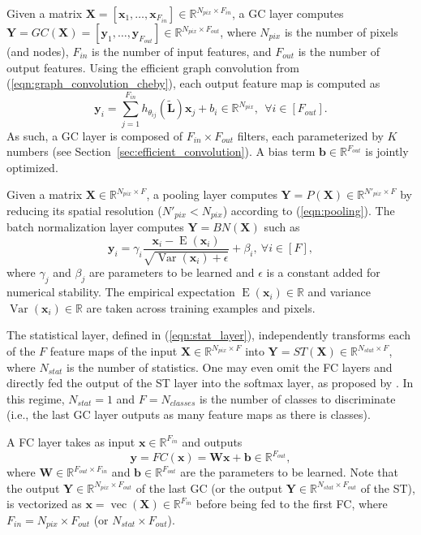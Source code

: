 \documentclass[final,twocolumn,3p,times,authoryear]{elsarticle}
\newcommand{\secref}[1]{Section~\ref{sec:#1}}
\newcommand{\eqnref}[1]{(\ref{eqn:#1})}
\renewcommand{\b}[1]{{\bm{#1}}}   %
\newcommand{\1}{\b{1}}              %
\newcommand{\0}{\b{0}}              %
\renewcommand{\L}{\b{L}}
\newcommand{\tL}{\tilde{\L}}
\newcommand{\W}{\b{W}}
\newcommand{\x}{\b{x}}
\newcommand{\X}{\b{X}}
\newcommand{\y}{\b{y}}
\newcommand{\Y}{\b{Y}}
\newcommand{\R}{\mathbb{R}}
\DeclareMathOperator*{\esp}{E}
\DeclareMathOperator*{\var}{Var}
\DeclareMathOperator*{\vect}{vec}
\begin{document}
Given a matrix $\X = [\x_1, \ldots, \x_{F_{in}}] \in \R^{N_{pix} \times F_{in}}$, a GC layer computes $\Y = GC(\X) = [\y_1, \ldots, \y_{F_{out}}] \in \R^{N_{pix} \times F_{out}}$, where $N_{pix}$ is the number of pixels (and nodes), $F_{in}$ is the number of input features, and $F_{out}$ is the number of output features.
Using the efficient graph convolution from \eqnref{graph_convolution_cheby}, each output feature map is computed as
\begin{equation*}
	\y_i = \sum_{j=1}^{F_{in}} h_{\theta_{ij}}(\tL) \x_j + b_i \in \R^{N_{pix}}, \ \ \forall i \in [F_{out}].
\end{equation*}
As such, a GC layer is composed of $F_{in} \times F_{out}$ filters, each parameterized by $K$ numbers (see \secref{efficient_convolution}). A bias term $\b b \in \R^{F_{out}}$ is jointly optimized.

Given a matrix $\X \in \R^{N_{pix} \times F}$, a pooling layer computes $\Y = P(\X) \in \R^{N'_{pix} \times F}$ by reducing its spatial resolution ($N'_{pix} < N_{pix}$) according to \eqnref{pooling}.
The batch normalization layer \citep{ioffe2015batchnorm} computes $\Y = BN(\X)$ such as
\begin{equation*}
	\y_i = \gamma_i \frac{\x_i - \esp(\x_i)}{\sqrt{\var(\x_i) + \epsilon}} + \beta_i, \ \forall i \in [F],
\end{equation*}
where $\gamma_{j}$ and $\beta_{j}$ are parameters to be learned and $\epsilon$ is a constant added for numerical stability. The empirical expectation $\esp(\x_i) \in \R$ and variance $\var(\x_i) \in \R$ are taken across training examples and pixels.

The statistical layer, defined in \eqnref{stat_layer}, independently transforms each of the $F$ feature maps of the input $\X \in \R^{N_{pix} \times F}$ into $\Y = ST(\X) \in \R^{N_{stat} \times F}$, where $N_{stat}$ is the number of statistics. One may even omit the FC layers and directly fed the output of the ST layer into the softmax layer, as proposed by \citet{lin2013globalavgpooling}. In this regime, $N_{stat} = 1$ and $F = N_{classes}$ is the number of classes to discriminate (i.e., the last GC layer outputs as many feature maps as there is classes).

A FC layer takes as input $\x \in \R^{F_{in}}$ and outputs
\begin{equation*}
	\y = FC(\x) = \b W \x + \b b \in \R^{F_{out}} ,
\end{equation*}
where $\W \in \R^{F_{out} \times F_{in}}$ and $\b b \in \R^{F_{out}}$ are the parameters to be learned.
Note that the output $\Y \in \R^{N_{pix} \times F_{out}}$ of the last GC (or the output $\Y \in \R^{N_{stat} \times F_{out}}$ of the ST), is vectorized as $\x = \vect(\X) \in \R^{F_{in}}$ before being fed to the first FC, where $F_{in} = N_{pix} \times F_{out}$ (or $N_{stat} \times F_{out}$).
\end{document}

